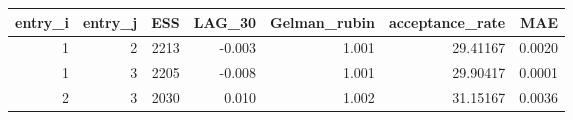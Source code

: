 \begin{longtable}{rrrrrrr}
\toprule
entry\_i & entry\_j & ESS & LAG\_30 & Gelman\_rubin & acceptance\_rate & MAE \\ 
\midrule
1 & 2 & 2213 & -0.003 & 1.001 & 29.41167 & 0.0020 \\ 
1 & 3 & 2205 & -0.008 & 1.001 & 29.90417 & 0.0001 \\ 
2 & 3 & 2030 & 0.010 & 1.002 & 31.15167 & 0.0036 \\ 
\bottomrule
\end{longtable}

